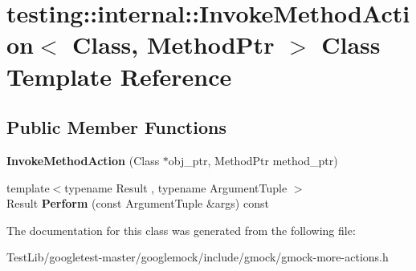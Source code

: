 \hypertarget{classtesting_1_1internal_1_1InvokeMethodAction}{}\section{testing\+:\+:internal\+:\+:Invoke\+Method\+Action$<$ Class, Method\+Ptr $>$ Class Template Reference}
\label{classtesting_1_1internal_1_1InvokeMethodAction}
\subsection*{Public Member Functions}
\begin{DoxyCompactItemize}
\item 
\mbox{\label{classtesting_1_1internal_1_1InvokeMethodAction_a16e545f6166e2d54eeafdc2ab3adf06b}} 
{\bfseries Invoke\+Method\+Action} (Class $\ast$obj\+\_\+ptr, Method\+Ptr method\+\_\+ptr)
\item 
\mbox{\label{classtesting_1_1internal_1_1InvokeMethodAction_aed6971c668bc2c7671d512306b25b1ab}} 
{\footnotesize template$<$typename Result , typename Argument\+Tuple $>$ }\\Result {\bfseries Perform} (const Argument\+Tuple \&args) const
\end{DoxyCompactItemize}


The documentation for this class was generated from the following file\+:\begin{DoxyCompactItemize}
\item 
Test\+Lib/googletest-\/master/googlemock/include/gmock/gmock-\/more-\/actions.\+h\end{DoxyCompactItemize}
